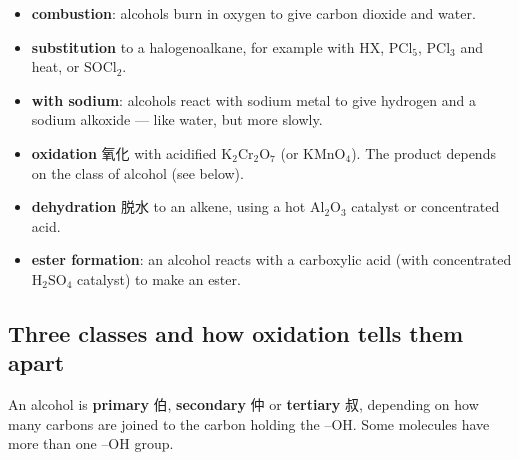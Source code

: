 \documentclass[11pt]{article}
\begin{document}
\begin{itemize}
\item \textbf{combustion}: alcohols burn in oxygen to give carbon dioxide and water.

\item \textbf{substitution} to a halogenoalkane, for example with $\text{HX}$, $\text{PCl}_5$, $\text{PCl}_3$ and heat, or $\text{SOCl}_2$.

\item \textbf{with sodium}: alcohols react with sodium metal to give hydrogen and a sodium alkoxide — like water, but more slowly.

\item \textbf{oxidation} 氧化 with acidified $\text{K}_2\text{Cr}_2\text{O}_7$ (or $\text{KMnO}_4$). The product depends on the class of alcohol (see below).

\item \textbf{dehydration} 脱水 to an alkene, using a hot $\text{Al}_2\text{O}_3$ catalyst or concentrated acid.

\item \textbf{ester formation}: an alcohol reacts with a carboxylic acid (with concentrated $\text{H}_2\text{SO}_4$ catalyst) to make an ester.

\end{itemize}

\subsection*{Three classes and how oxidation tells them apart}

An alcohol is \textbf{primary} 伯, \textbf{secondary} 仲 or \textbf{tertiary} 叔, depending on how many carbons are joined to the carbon holding the $\text{–OH}$. Some molecules have more than one $\text{–OH}$ group.

\begin{center}
\end{center}
\end{document}
